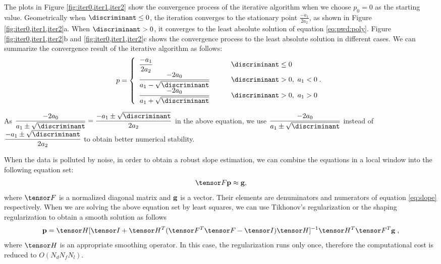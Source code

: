 The plots in Figure \ref{fig:iter0,iter1,iter2} show the convergence process
of the iterative algorithm when we choose $p_0=0$ as the starting value.
Geometrically when $\discriminant\leq 0$, 
the iteration converges to the stationary point $\displaystyle{\frac{-a_1}{2a_2}}$,
as shown in Figure \ref{fig:iter0,iter1,iter2}a.
When $\discriminant >0$, 
it converges to the least absolute solution of equation \ref{eq:pwd:poly}.
Figure \ref{fig:iter0,iter1,iter2}b and \ref{fig:iter0,iter1,iter2}c 
shows the convergence process 
to the least absolute solution in different cases.
We can summarize the convergence result of the iterative algorithm as follows:
\begin{equation}\label{eq:slope}
p=\left\{\begin{array}{ll}
\displaystyle{\frac{-a_1}{2a_2}}  & \discriminant\leq 0\\
\displaystyle{\frac{-2a_0}{a_1-\sqrt{\discriminant}}} \qquad 
& \discriminant >0, ~a_1<0\;.\\
\displaystyle{\frac{-2a_0}{a_1+\sqrt{\discriminant}}}  
& \discriminant >0, ~a_1>0\\
\end{array}\right.
\end{equation}

As $\displaystyle{\frac{-2a_0}{a_1\pm\sqrt{\discriminant}}=
\frac{-a_1\pm\sqrt{\discriminant}}{2a_2}}$
in the above equation, we use 
$\displaystyle{\frac{-2a_0}{a_1\pm\sqrt{\discriminant}}}$
instead of 
$\displaystyle{\frac{-a_1\pm\sqrt{\discriminant}}{2a_2}}$
to obtain better numerical stability.



When the data is polluted by noise,
in order to obtain a robust slope estimation,
we can combine the equations in a local window into the following equation set:
\begin{equation}
\mtx F \vct p \approx \vct g,
\end{equation}
where $\mtx F$ is a normalized diagonal matrix and $\mathbf g$ is a vector.
Their elements are denuminators and numerators of 
equation \ref{eq:slope} respectively.
When we are solving the above equation set by least squares,
we can use Tikhonov's regularization \cite[]{fomel:1946} or
the shaping regularization \cite[~equation 13]{fomel:R29}
to obtain a smooth solution as follows
\begin{equation}
\vct p = \mtx H
[\mtx I+\mtx H^T (\mtx F^T\mtx F-\mtx I)\mtx H]^{-1}
\mtx H^T\mtx F^T \vct g\;,
\end{equation}
where $\mtx H$ is an appropriate smoothing operator.
In this case, the regularization runs only once,
therefore the computational cost is reduced to $O(N_dN_fN_l)$.

